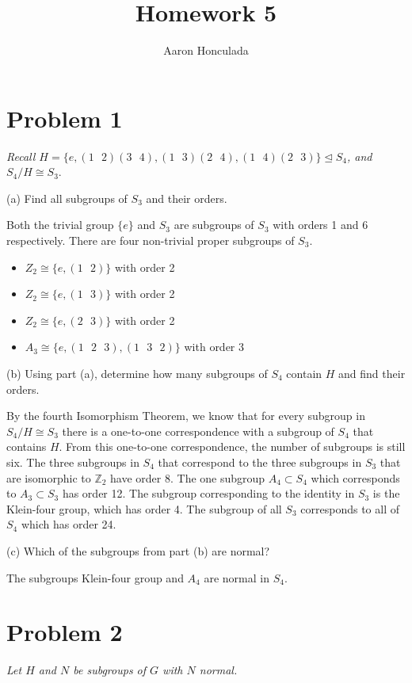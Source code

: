 \documentclass{article}
\title{Homework 5}
\author{Aaron Honculada}
\date{\monthname[\month] \the\year}
\theoremstyle{plain} %
\theoremstyle{definition} %
\begin{document}
\maketitle

\section*{Problem 1}
\noindent\textit{Recall $H = \{e, (1\text{ }2)(3\text{ }4), (1\text{ }3)(2\text{ }4),
(1\text{ }4)(2\text{ }3)\} \trianglelefteq S_4$, and $S_4/H \cong S_3$}.

\noindent(a) Find all subgroups of $S_3$ and their orders.

Both the trivial group $\{ e \}$ and $S_3$ are subgroups of $S_3$ with orders
1 and 6 respectively. There are four non-trivial proper subgroups of $S_3$. 
\begin{itemize}
    \item $Z_2 \cong \{e, (1\text{ }2)\}$ with order 2
    \item $Z_2 \cong \{e, (1\text{ }3)\}$ with order 2
    \item $Z_2 \cong \{e, (2\text{ }3)\}$ with order 2
    \item $A_3 \cong \{e, (1\text{ }2\text{ }3), (1\text{ }3\text{ }2) \}$ with order 3
\end{itemize}

\noindent(b) Using part (a), determine how many subgroups of $S_4$ contain $H$ and find their orders.

By the fourth Isomorphism Theorem, we know that for every subgroup in
$S_4/H \cong S_3$ there is a one-to-one correspondence with a subgroup of $S_4$ that contains
$H$. From this one-to-one correspondence, the number of subgroups
is still six. The three subgroups in $S_4$ that correspond to the three
subgroups in $S_3$ that are isomorphic to $\mathbb{Z}_2$ have order 8. The one
subgroup $A_4 \subset S_4$ which corresponds to $A_3 \subset S_3$ has order 12. The subgroup
corresponding to the identity in $S_3$ is the Klein-four group, which has order 4. 
The subgroup of all $S_3$ corresponds to all of $S_4$ which has order 24.

\noindent(c) Which of the subgroups from part (b) are normal?

The subgroups Klein-four group and $A_4$ are normal in $S_4$.

\section*{Problem 2}
\noindent\textit{Let $H$ and $N$ be subgroups of $G$ with $N$ normal.}
\end{document}
